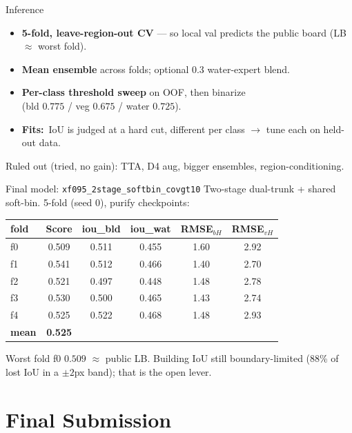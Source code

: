 \documentclass[aspectratio=169,11pt]{beamer}
\newcommand{\fit}{\textcolor{cHead}{\textbf{Fits:}}\ }
\newcommand{\code}[1]{\texttt{\small #1}}
\begin{document}
\begin{frame}{Inference}
  \begin{itemize}
    \item \textbf{5-fold, leave-region-out CV} --- so local val predicts the
      public board (LB $\approx$ worst fold).
    \item \textbf{Mean ensemble} across folds; optional 0.3 water-expert blend.
    \item \textbf{Per-class threshold sweep} on OOF, then binarize\\
      (bld $0.775$ / veg $0.675$ / water $0.725$).
    \item \fit IoU is judged at a hard cut, different per class $\to$ tune each
      on held-out data.
  \end{itemize}
  \vfill
  {\footnotesize Ruled out (tried, no gain): TTA, D4 aug, bigger ensembles, region-conditioning.}
\end{frame}

\begin{frame}{Final model: \code{xf095\_2stage\_softbin\_covgt10}}
  Two-stage dual-trunk + shared soft-bin.
  5-fold (seed 0), purify checkpoints:
  \begin{center}\small
  \begin{tabular}{lccccc}
    \toprule
    fold & Score & iou\_bld & iou\_wat & RMSE$_{bH}$ & RMSE$_{vH}$\\
    \midrule
    f0 & 0.509 & 0.511 & 0.455 & 1.60 & 2.92\\
    f1 & 0.541 & 0.512 & 0.466 & 1.40 & 2.70\\
    f2 & 0.521 & 0.497 & 0.448 & 1.48 & 2.78\\
    f3 & 0.530 & 0.500 & 0.465 & 1.43 & 2.74\\
    f4 & 0.525 & 0.522 & 0.468 & 1.48 & 2.93\\
    \midrule
    \textbf{mean} & \textbf{0.525} & & & &\\
    \bottomrule
  \end{tabular}
  \end{center}
  \footnotesize Worst fold f0 $0.509$ $\approx$ public LB. Building IoU still
  boundary-limited (88\% of lost IoU in a $\pm2$px band); that is the open lever.
\end{frame}

\section{Final Submission}
\end{document}
